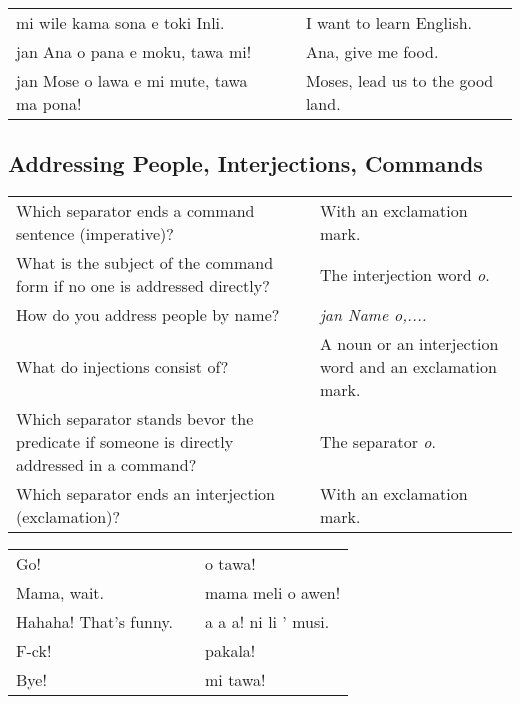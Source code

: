 \begin{supertabular}{p{5,5cm}|ll}
    mi wile kama sona e toki Inli.           &  & I want to learn English.         \\
    jan Ana o pana e moku, tawa mi!          &  & Ana, give me food.               \\
    jan Mose o lawa e mi mute, tawa ma pona! &  & Moses, lead us to the good land. \\
\end{supertabular}

\newpage

\subsection*{Addressing People, Interjections, Commands}
\label{'commands_interjections'}

\begin{supertabular}{p{5,5cm}|ll}
    Which separator ends a command sentence (imperative)?                                      &  & With an exclamation mark.                               \\
    What is the subject of the command form if no one is addressed directly?                   &  & The interjection word \textit{o}.                       \\
    How do you address people by name?                                                         &  & \textit{jan Name o,.... }                               \\
    What do injections consist of?                                                             &  & A noun or an interjection word and an exclamation mark. \\
    Which separator stands bevor  the predicate if someone is directly addressed in a command? &  & The separator \textit{o}.                               \\
    Which separator ends an interjection (exclamation)?                                        &  & With an exclamation mark.                               \\
\end{supertabular}

\begin{supertabular}{p{5,5cm}|ll}
    Go!                   &  & o tawa!              \\
    Mama, wait.           &  & mama meli o awen!    \\
    Hahaha! That's funny. &  & a a a! ni li ' musi. \\
    F-ck!                 &  & pakala!              \\
    Bye!                  &  & mi tawa!             \\
\end{supertabular}


